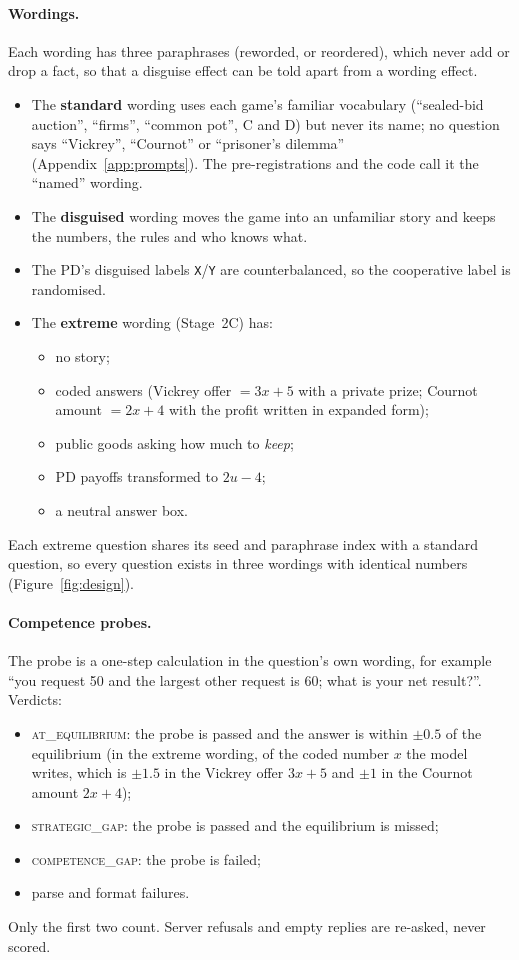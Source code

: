 \documentclass[10pt]{article}
\theoremstyle{definition}
\theoremstyle{remark}
\begin{document}
\paragraph{Wordings.} Each wording has three paraphrases (reworded, or reordered), which never
add or drop a fact, so that a disguise effect can be told apart from a wording effect.
\begin{itemize}
\item The \textbf{standard} wording uses each game's familiar vocabulary (``sealed-bid auction'',
  ``firms'', ``common pot'', C and D) but never its name; no question says ``Vickrey'',
  ``Cournot'' or ``prisoner's dilemma'' (Appendix~\ref{app:prompts}). The pre-registrations and the
  code call it the ``named'' wording.
\item The \textbf{disguised} wording moves the game into an unfamiliar story and keeps the
  numbers, the rules and who knows what.
\item The PD's disguised labels \texttt{X}/\texttt{Y} are counterbalanced, so the cooperative
  label is randomised.
\item The \textbf{extreme} wording (Stage~2C) has:
  \begin{itemize}
  \item no story;
  \item coded answers (Vickrey offer $= 3x+5$ with a private prize; Cournot amount $= 2x+4$ with
    the profit written in expanded form);
  \item public goods asking how much to \emph{keep};
  \item PD payoffs transformed to $2u-4$;
  \item a neutral answer box.
  \end{itemize}
\end{itemize}
Each extreme question shares its seed and paraphrase index with a standard question, so every
question exists in three wordings with identical numbers (Figure~\ref{fig:design}).

\paragraph{Competence probes.} The probe is a one-step calculation in the question's own wording,
for example ``you request 50 and the largest other request is 60; what is your net result?''.
Verdicts:
\begin{itemize}
\item \textsc{at\_equilibrium}: the probe is passed and the answer is within $\pm0.5$ of the
  equilibrium (in the extreme wording, of the coded number $x$ the model writes, which is
  $\pm1.5$ in the Vickrey offer $3x+5$ and $\pm1$ in the Cournot amount $2x+4$);
\item \textsc{strategic\_gap}: the probe is passed and the equilibrium is missed;
\item \textsc{competence\_gap}: the probe is failed;
\item parse and format failures.
\end{itemize}
Only the first two count. Server refusals and empty replies are re-asked, never scored.
\end{document}
